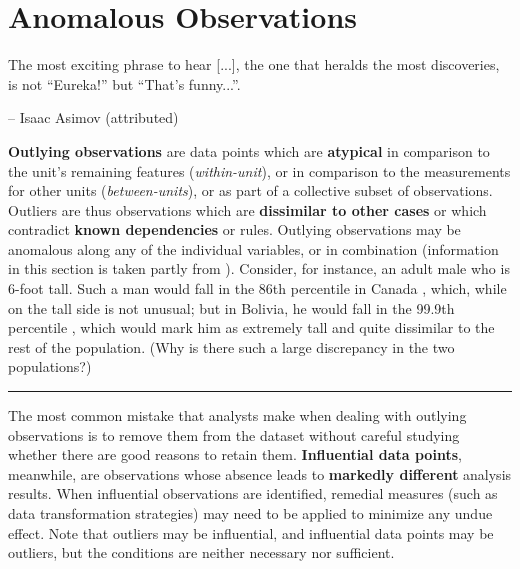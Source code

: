 \section{Anomalous Observations}
\begin{tcolorbox}[title=The Good Doctor's Take]
The most exciting phrase to hear [...], the one that heralds the most discoveries, is not ``Eureka!'' but ``That's funny...''.
 \\[-0.6cm]
\begin{flushright}
-- Isaac Asimov (attributed) 
\end{flushright}
\end{tcolorbox}
\noindent
\textbf{Outlying observations} are data points which are \textbf{atypical} in comparison to the unit's remaining features (\textit{within-unit}), or in comparison to the measurements for other units (\textit{between-units}), or as part of a collective subset of observations. Outliers are thus observations which are \textbf{dissimilar to other cases} or which contradict \textbf{known dependencies} or rules. Outlying observations may be anomalous along any of the individual variables, or in combination (information in this section is taken partly from \cite{DP_OW,DP_A,DP_T,DP_CBK}).
\newl Consider, for instance, an adult male who is 6-foot tall. Such a man would fall in the 86th percentile in Canada \cite{DP_HPC}, which, while on the tall side is not unusual; but in Bolivia, he would fall in the 99.9th percentile \cite{DP_HPC}, which would mark him as extremely tall and quite dissimilar to the rest of the population. (Why is there such a large discrepancy in the two populations?)  
\begin{center}
    \rule{0.5\textwidth}{.4pt}
\end{center}
The most common mistake that analysts make when dealing with outlying observations is to remove them from the dataset without careful studying whether there are good reasons to retain them. \newl \textbf{Influential data points}, meanwhile, are observations whose absence leads to \textbf{markedly different} analysis results. When influential observations are identified, remedial measures (such as data transformation strategies) may need to be applied to minimize any undue effect. Note that outliers may be influential, and influential data points may be outliers, but the conditions are neither necessary nor sufficient. 
